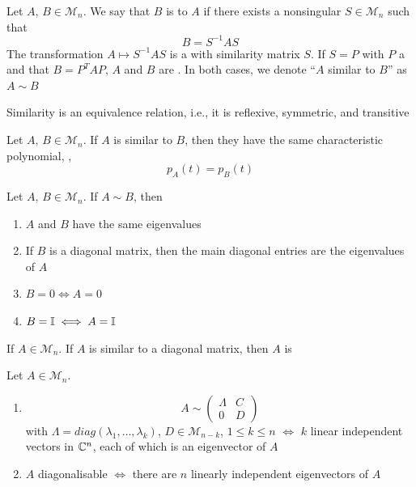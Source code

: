 \documentclass[aspectratio=169]{beamer}
\begin{document}
\begin{frame}
\begin{definition}
Let $A,\, B\in\mathcal{M}_n$. We say that $B$ is  to $A$ if there exists a nonsingular $S\in \mathcal{M}_n$ such that 
\[
  B=S^{-1} AS
\]
The transformation $A\mapsto S^{-1}AS$ is a  with similarity matrix $S$. 
If $S=P$ with $P$ a  and that $B= P^{T} AP$, $A$ and $B$ are . 
In both cases, we denote ``$A$ similar to $B$'' as $A \sim B$
\end{definition}
\vfill
\begin{theorem}
Similarity is an equivalence relation, i.e., it is reflexive, symmetric, and transitive
\end{theorem}
\end{frame}

\begin{frame}
\begin{theorem}
 Let $A, \, B\in \mathcal{M}_n$. If $A$ is similar to $B$, then they have the same characteristic polynomial, \ie,
 \[p_A(t)= p_B(t) 
\]
\end{theorem}
\vfill
\begin{corollary}
Let $A,\, B\in \mathcal{M}_n$. If $A\sim B$, then 
\begin{enumerate}
\item $A$ and $B$ have the same eigenvalues
\item If $B$ is a diagonal matrix, then the main diagonal entries are the eigenvalues of $A$
\item $B=0\iff A=0$
\item $B=\mathbb{I}\iff A=\mathbb{I}$
\end{enumerate}
\end{corollary}
\end{frame}

\begin{frame}
\begin{definition}
If $A\in \mathcal{M}_n$. If $A$ is similar to a diagonal matrix, then $A$ is 
\end{definition}
\end{frame}

\begin{frame}
\begin{theorem}
Let $A\in \mathcal{M}_n$. 
\begin{enumerate}
\item 
\begin{equation}
A\sim \begin{pmatrix}
\Lambda & C\\
0& D
\end{pmatrix}
\end{equation}
with $\Lambda= diag(\lambda_1,\ldots, \lambda_k)$, $D\in \mathcal{M}_{n-k}$, $1\leq k\leq n$ $\iff$ $k$ linear independent vectors in $\mathbb{C}^n$, each of which is an eigenvector of $A$
\item $A$ diagonalisable $\iff$ there are $n$ linearly independent eigenvectors of $A$
\end{enumerate}
\end{theorem}
\end{frame}
\end{document}

